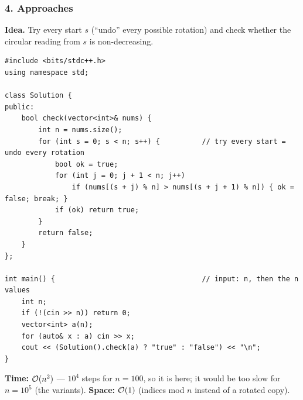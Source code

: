 \begin{diagrambox}
\end{diagrambox}

\subsubsection*{4. Approaches}

\begin{bruteforcebox}
\textbf{Idea.} Try every start $s$ (``undo'' every possible rotation) and check whether the circular reading from $s$ is non-decreasing.
\begin{lstlisting}[style=cpp]
#include <bits/stdc++.h>
using namespace std;

class Solution {
public:
    bool check(vector<int>& nums) {
        int n = nums.size();
        for (int s = 0; s < n; s++) {          // try every start = undo every rotation
            bool ok = true;
            for (int j = 0; j + 1 < n; j++)
                if (nums[(s + j) % n] > nums[(s + j + 1) % n]) { ok = false; break; }
            if (ok) return true;
        }
        return false;
    }
};

int main() {                                   // input: n, then the n values
    int n;
    if (!(cin >> n)) return 0;
    vector<int> a(n);
    for (auto& x : a) cin >> x;
    cout << (Solution().check(a) ? "true" : "false") << "\n";
}
\end{lstlisting}
\begin{complexitybox}
\textbf{Time:} $\mathcal{O}(n^2)$ --- $10^4$ steps for $n = 100$, so it is \ac{} here; it would be too slow for $n = 10^5$ (the variants). \textbf{Space:} $\mathcal{O}(1)$ (indices mod $n$ instead of a rotated copy).
\end{complexitybox}
\end{bruteforcebox}

